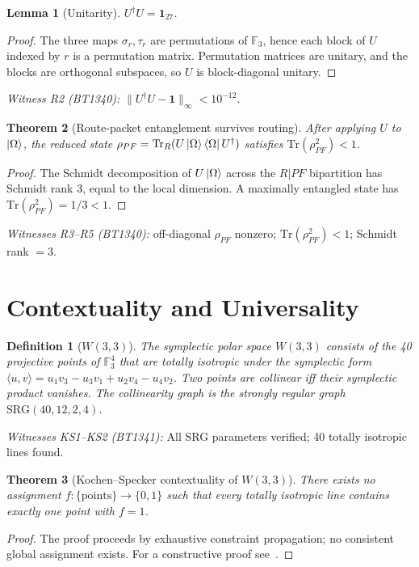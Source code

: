 \documentclass[prl,twocolumn,showpacs,superscriptaddress,longbibliography]{revtex4-2}
\newtheorem{theorem}{Theorem}
\newtheorem{lemma}[theorem]{Lemma}
\newtheorem{definition}{Definition}
\newcommand{\F}{\mathbb{F}}
\newcommand{\W}{W(3,3)}
\begin{document}
\begin{lemma}[Unitarity]
$U^\dagger U = \mathbf{1}_{27}$.
\end{lemma}
\begin{proof}
The three maps $\sigma_r,\tau_r$ are permutations of $\F_3$,
hence each block of $U$ indexed by $r$ is a permutation matrix.
Permutation matrices are unitary, and the blocks are orthogonal
subspaces, so $U$ is block-diagonal unitary.
\end{proof}

\noindent
\emph{Witness R2 (BT1340):} $\|U^\dagger U - \mathbf{1}\|_\infty < 10^{-12}$.

\begin{theorem}[Route-packet entanglement survives routing]
After applying $U$ to $\ket{\Omega}$, the reduced state
$\rho_{PF} = \mathrm{Tr}_R(U\ket{\Omega}\bra{\Omega}U^\dagger)$
satisfies $\mathrm{Tr}(\rho_{PF}^2) < 1$.
\end{theorem}
\begin{proof}
The Schmidt decomposition of $U\ket{\Omega}$ across the $R|PF$
bipartition has Schmidt rank 3, equal to the local dimension.
A maximally entangled state has $\mathrm{Tr}(\rho_{PF}^2) = 1/3 < 1$.
\end{proof}

\noindent
\emph{Witnesses R3--R5 (BT1340):} off-diagonal $\rho_{PF}$ nonzero;
$\mathrm{Tr}(\rho_{PF}^2) < 1$; Schmidt rank $= 3$.

\section{Contextuality and Universality}\label{sec:ks}

\begin{definition}[$W(3,3)$]
The symplectic polar space $\W$ consists of the 40 projective
points of $\F_3^4$ that are totally isotropic under the symplectic
form $\langle u,v\rangle = u_1v_3 - u_3v_1 + u_2v_4 - u_4v_2$.
Two points are collinear iff their symplectic product vanishes.
The collinearity graph is the strongly regular graph
$\mathrm{SRG}(40,12,2,4)$.
\end{definition}

\emph{Witnesses KS1--KS2 (BT1341):}
All SRG parameters verified; 40 totally isotropic lines found.

\begin{theorem}[Kochen--Specker contextuality of $\W$]\label{thm:ks}
There exists no assignment $f:\{\text{points}\}\to\{0,1\}$
such that every totally isotropic line contains exactly one
point with $f=1$.
\end{theorem}
\begin{proof}
The proof proceeds by exhaustive constraint propagation;
no consistent global assignment exists.
For a constructive proof see~\cite{KS1967}.
\end{proof}
\end{document}
